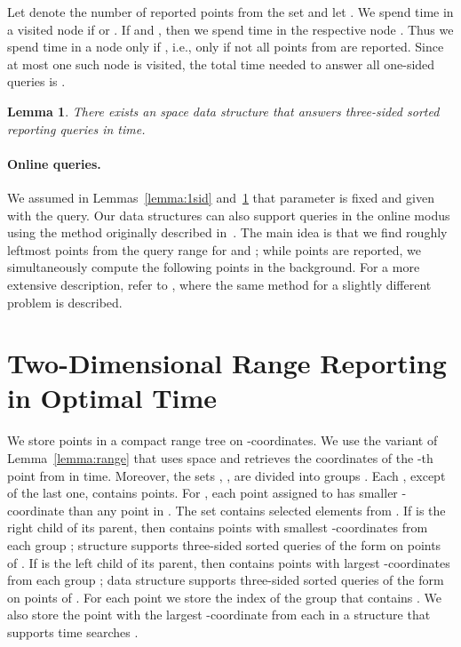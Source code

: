 \documentclass[11pt]{article}
\newcommand{\no}[1]{}
\newtheorem{lemma}{Lemma}
\begin{document}
Let  denote the number of reported points from the set  
and let . 
We spend  time in a visited node  if 
or . If   and , then we spend 
 time in the respective node . 
Thus we spend  time in a node 
only if , i.e., only if not all points from 
are reported.
Since at most one such 
node  is visited, the total time needed to answer all one-sided queries is . 
\no{
in the decreasing order of . For every found point , we visit the node  that contains .
Using , we report the  leftmost points  such that
. 
}
\begin{lemma}\label{lemma:3sid}
  There exists an  space data structure that answers
  three-sided sorted reporting queries in  time.
\end{lemma}

\paragraph{Online queries.}
We assumed in Lemmas~\ref{lemma:1sid} and~\ref{lemma:3sid} that 
parameter  is fixed and given with the query. 
Our data structures can also support queries in the online modus using 
the method originally described in~\cite{BrodalFGL09}. 
The main idea is that we find roughly  leftmost points from the 
query range for  and ; while  points are reported, we simultaneously compute the following  points in the background. 
For a more extensive description, refer to \cite[Section 4.1]{NavN12}, where the same method for a slightly different problem is described.   


\section{Two-Dimensional Range Reporting in Optimal Time}
\label{sec:2dim-range}
We store points in a compact range tree  on
-coordinates. We use the variant  of Lemma~\ref{lemma:range} that uses 
 space and retrieves the coordinates of the -th point
 from
  in  time. Moreover, the sets , , are divided into
groups . Each , except of the last one, contains
 points. For , each point assigned to  has smaller -coordinate than any point in . The set  contains selected elements from . If  is the right child of its
parent, then  contains  points with smallest
-coordinates from each group ; structure 
supports three-sided sorted queries of the form  on
points of .  If  is the left child of its parent, then
 contains  points with largest -coordinates from
each group ; data structure  supports three-sided
sorted queries of the form  on points of
.  For each point  we store the index  of the
group  that contains .  We also store the point with
the largest -coordinate from each  in a structure
 that supports  time searches \cite{BoasKZ77}.
\end{document}
